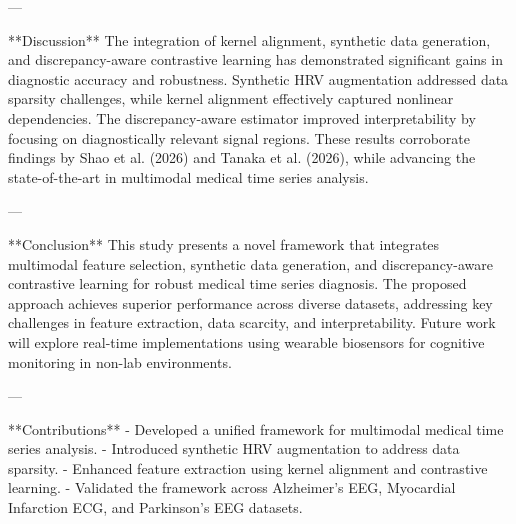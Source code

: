 ---

**Discussion**  
The integration of kernel alignment, synthetic data generation, and discrepancy-aware contrastive learning has demonstrated significant gains in diagnostic accuracy and robustness. Synthetic HRV augmentation addressed data sparsity challenges, while kernel alignment effectively captured nonlinear dependencies. The discrepancy-aware estimator improved interpretability by focusing on diagnostically relevant signal regions. These results corroborate findings by Shao et al. (2026) and Tanaka et al. (2026), while advancing the state-of-the-art in multimodal medical time series analysis.

---

**Conclusion**  
This study presents a novel framework that integrates multimodal feature selection, synthetic data generation, and discrepancy-aware contrastive learning for robust medical time series diagnosis. The proposed approach achieves superior performance across diverse datasets, addressing key challenges in feature extraction, data scarcity, and interpretability. Future work will explore real-time implementations using wearable biosensors for cognitive monitoring in non-lab environments.

---

**Contributions**  
- Developed a unified framework for multimodal medical time series analysis.  
- Introduced synthetic HRV augmentation to address data sparsity.  
- Enhanced feature extraction using kernel alignment and contrastive learning.  
- Validated the framework across Alzheimer's EEG, Myocardial Infarction ECG, and Parkinson's EEG datasets.  

